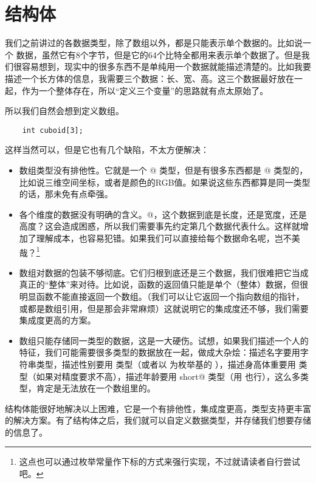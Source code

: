 \section{结构体}
我们之前讲过的各数据类型，除了数组以外，都是只能表示单个数据的。比如说一个 \lstinline@double@ 数据，虽然它有8个字节，但是它的64个比特全都用来表示单个数据了。但是我们很容易想到，现实中的很多东西不是单纯用一个数据就能描述清楚的。比如我要描述一个长方体的信息，我需要三个数据：长、宽、高。这三个数据最好放在一起，作为一个整体存在，所以``定义三个变量''的思路就有点太原始了。\par
所以我们自然会想到定义数组。
\begin{lstlisting}
    int cuboid[3];
\end{lstlisting}
这样当然可以，但是它也有几个缺陷，不太方便解决：
\begin{itemize}
    \item 数组类型没有排他性。它就是一个 \lstinline@int[3]@ 类型，但是有很多东西都是 \lstinline@int[3]@ 类型的，比如说三维空间坐标，或者是颜色的RGB值。如果说这些东西都算是同一类型的话，那未免有点牵强。
    \item 各个维度的数据没有明确的含义。\lstinline@cuboid[0]@，这个数据到底是长度，还是宽度，还是高度？这会造成困惑，所以我们需要事先约定第几个数据代表什么。这样就增加了理解成本，也容易犯错。如果我们可以直接给每个数据命名呢，岂不美哉？\footnote{这点也可以通过枚举常量作下标的方式来强行实现，不过就请读者自行尝试吧。}
    \item 数组对数据的包装不够彻底。它们归根到底还是三个数据，我们很难把它当成真正的``整体''来对待。比如说，函数的返回值只能是单个（整体）数据，但很明显函数不能直接返回一个数组。（我们可以让它返回一个指向数组的指针，或都是数组引用，但是那会非常麻烦）这就说明它的集成度还不够，我们需要集成度更高的方案。
    \item 数组只能存储同一类型的数据，这是一大硬伤。试想，如果我们描述一个人的特征，我们可能需要很多类型的数据放在一起，做成大杂烩：描述名字要用字符串类型，描述性别要用 \lstinline@bool@ 类型（或者以 \lstinline@bool@ 为枚举基的 \lstinline@Sex@），描述身高体重要用 \lstinline@float@ 类型（如果对精度要求不高），描述年龄要用 \lstinline@unsigned short@ 类型（用 \lstinline@int@ 也行），这么多类型，肯定是无法放在一个数组里的。
\end{itemize}
结构体能很好地解决以上困难，它是一个有排他性，集成度更高，类型支持更丰富的解决方案。有了结构体之后，我们就可以自定义数据类型，并存储我们想要存储的信息了。\par
